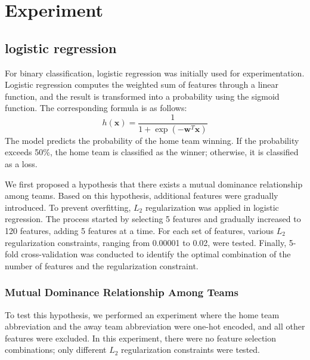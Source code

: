 \documentclass[12pt,a4paper]{article}
\begin{document}


\section{Experiment}
\subsection{logistic regression}

For binary classification, logistic regression was initially used for experimentation. Logistic regression computes the weighted sum of features through a linear function, and the result is transformed into a probability using the sigmoid function. The corresponding formula is as follows:
\[
h(\mathbf{x}) = \frac{1}{1 + \exp(-\mathbf{w}^T \mathbf{x})}
\]
The model predicts the probability of the home team winning. If the probability exceeds 50\%, the home team is classified as the winner; otherwise, it is classified as a loss.

We first proposed a hypothesis that there exists a mutual dominance relationship among teams. Based on this hypothesis, additional features were gradually introduced. To prevent overfitting, \( L_2 \) regularization was applied in logistic regression. The process started by selecting 5 features and gradually increased to 120 features, adding 5 features at a time. For each set of features, various \( L_2 \) regularization constraints, ranging from 0.00001 to 0.02, were tested. Finally, 5-fold cross-validation was conducted to identify the optimal combination of the number of features and the regularization constraint.

\subsubsection{Mutual Dominance Relationship Among Teams}  

To test this hypothesis, we performed an experiment where the home team abbreviation and the away team abbreviation were one-hot encoded, and all other features were excluded. In this experiment, there were no feature selection combinations; only different \(L_2\) regularization constraints were tested.
\end{document}
